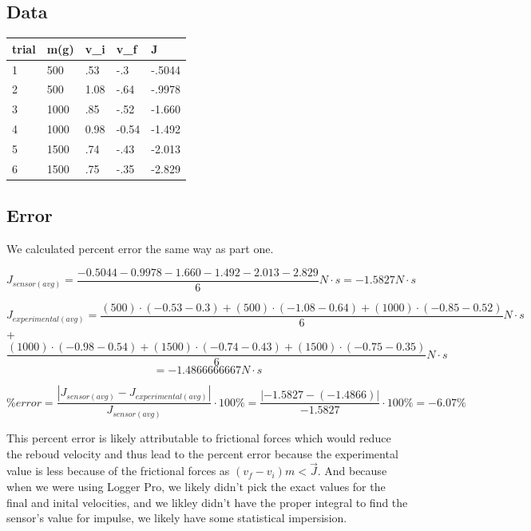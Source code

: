 \documentclass{report}
\begin{document}
\subsection*{Data}
\begin{table}[h!]
\begin{center}
\begin{tabular}{|l|l|l|l|l|}
\hline
trial & m(g) & v\_i & v\_f  & J      \\ \hline
1     & 500  & .53  & -.3   & -.5044 \\ \hline
2     & 500  & 1.08 & -.64  & -.9978 \\ \hline
3     & 1000 & .85  & -.52  & -1.660 \\ \hline
4     & 1000 & 0.98 & -0.54 & -1.492 \\ \hline
5     & 1500 & .74  & -.43  & -2.013 \\ \hline
6     & 1500 & .75  & -.35  & -2.829 \\ \hline
\end{tabular}
\end{center}
\end{table}

\subsection*{Error}

We calculated percent error the same way as part one. 

$$ J_{sensor(avg)} = \frac{-0.5044 - 0.9978 - 1.660 - 1.492 - 2.013 - 2.829}{6} N\cdot s = -1.5827 N \cdot s$$ 

$$ J_{experimental(avg)} = \frac{(500) \cdot (-0.53 - 0.3) + (500) \cdot (-1.08 - 0.64) + (1000) \cdot (-0.85 - 0.52)}{6} N \cdot s$$ + $$\frac{(1000) \cdot (-0.98 - 0.54) + (1500) \cdot (-0.74 - 0.43) + (1500) \cdot (-0.75 - 0.35)}{6} N \cdot s$$ $$ = -1.4866666667 N \cdot s$$

$$ \% error = \frac{|J_{sensor(avg)} - J_{experimental(avg)}|}{J_{sensor(avg)}} \cdot 100\% = \frac{|-1.5827 - (-1.4866)|}{-1.5827} \cdot 100\% = -6.07\%$$

This percent error is likely attributable to frictional forces which would reduce the reboud velocity and thus lead to the percent error because the experimental value is less because of the frictional forces as $ (v_f - v_i)m < \vec{J}$. And because when we were using Logger Pro, we likely didn't pick the exact values for the final and inital velocities, and we likley didn't have the proper integral to find the sensor's value for impulse, we likely have some statistical impersision.
\end{document}
